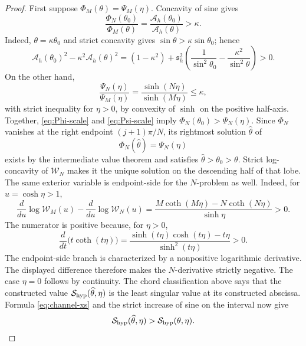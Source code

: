\documentclass[11pt,a4paper]{article}
\numberwithin{equation}{section}
\begin{document}
\begin{proof}
First suppose \(\Phi_M(\theta)=\Psi_M(\eta)\).  Concavity of sine gives
\begin{equation}\label{eq:Phi-scale}
 \frac{\Phi_N(\theta_0)}{\Phi_M(\theta)}
 =\frac{\mathcal A_h(\theta_0)}{\mathcal A_h(\theta)}>\kappa.
\end{equation}
Indeed, \(\theta=\kappa\theta_0\) and strict concavity gives
\(\sin\theta>\kappa\sin\theta_0\); hence
\[
 \mathcal A_h(\theta_0)^2-\kappa^2\mathcal A_h(\theta)^2
 =(1-\kappa^2)+\mathfrak s_h^2\left(
 \frac1{\sin^2\theta_0}-\frac{\kappa^2}{\sin^2\theta}
 \right)>0.
\]
On the other hand,
\begin{equation}\label{eq:Psi-scale}
 \frac{\Psi_N(\eta)}{\Psi_M(\eta)}
 =\frac{\sinh(N\eta)}{\sinh(M\eta)}\leq\kappa,
\end{equation}
with strict inequality for \(\eta>0\), by convexity of \(\sinh\) on
the positive half-axis.  Together, \eqref{eq:Phi-scale} and
\eqref{eq:Psi-scale} imply
\(\Phi_N(\theta_0)>\Psi_N(\eta)\).  Since \(\Phi_N\) vanishes at the right
endpoint \((j+1)\pi/N\), its rightmost solution
\(\widehat\theta\) of
\[
 \Phi_N(\widehat\theta)=\Psi_N(\eta)
\]
exists by the intermediate value theorem and satisfies
\(\widehat\theta>\theta_0>\theta\).  Strict log-concavity of
\(\mathcal W_N\) makes it the unique solution on the descending half
of that lobe.  The same exterior
variable is endpoint-side for the \(N\)-problem as well.  Indeed, for
\(u=\cosh\eta>1\),
\[
 \frac{d}{du}\log\mathcal W_M(u)-
 \frac{d}{du}\log\mathcal W_N(u)
 =\frac{M\coth(M\eta)-N\coth(N\eta)}{\sinh\eta}>0.
\]
The numerator is positive because, for \(\eta>0\),
\[
 \frac{d}{dt}\bigl(t\coth(t\eta)\bigr)
 =\frac{\sinh(t\eta)\cosh(t\eta)-t\eta}{\sinh^2(t\eta)}>0.
\]
The endpoint-side branch is characterized by a nonpositive logarithmic
derivative.  The displayed difference therefore makes the
\(N\)-derivative strictly negative.  The case \(\eta=0\) follows by
continuity.
The chord classification above says that the constructed value
\(\mathcal S_{\rm hyp}(\widehat\theta,\eta)\) is the least singular
value at its constructed abscissa.  Formula
\eqref{eq:channel-xs} and the strict increase of sine on the interval
now give
\begin{equation}\label{eq:hyper-height-increase}
 \mathcal S_{\rm hyp}(\widehat\theta,\eta)
 >\mathcal S_{\rm hyp}(\theta,\eta).
\end{equation}


\end{proof}
\end{document}
